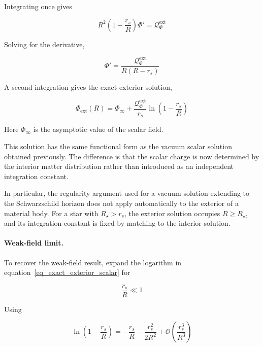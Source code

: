 \documentclass[pdflatex,sn-mathphys-num]{sn-jnl}%
\theoremstyle{thmstyleone}%
\theoremstyle{thmstyletwo}%
\theoremstyle{thmstylethree}%
\begin{document}
Integrating once gives

\begin{equation}
    R^2
    \left(
        1-\frac{r_s}{R}
    \right)
    \Phi'
    =
    \mathcal Q_\Phi^{\mathrm{ext}}
\end{equation}

Solving for the derivative,

\begin{equation}
    \Phi'
    =
    \frac{\mathcal Q_\Phi^{\mathrm{ext}}}
    {R(R-r_s)}
\end{equation}

A second integration gives the exact exterior solution,

\begin{equation}\label{eq_exact_exterior_scalar}
    \boxed{
    \Phi_{\mathrm{ext}}(R)
    =
    \Phi_\infty
    +
    \frac{\mathcal Q_\Phi^{\mathrm{ext}}}{r_s}
    \ln\left(
        1-\frac{r_s}{R}
    \right)
    }
\end{equation}

Here $\Phi_\infty$ is the asymptotic value of the scalar field.

This solution has the same functional form as the vacuum scalar solution obtained previously. The difference is that the scalar charge is now determined by the interior matter distribution rather than introduced as an independent integration constant.

In particular, the regularity argument used for a vacuum solution extending to the Schwarzschild horizon does not apply automatically to the exterior of a material body. For a star with $R_\star>r_s$, the exterior solution occupies $R\geq R_\star$, and its integration constant is fixed by matching to the interior solution.

\paragraph{Weak-field limit.}

To recover the weak-field result, expand the logarithm in equation~\eqref{eq_exact_exterior_scalar} for

\begin{equation}
    \frac{r_s}{R}\ll 1
\end{equation}

Using

\begin{equation}
    \ln\left(
        1-\frac{r_s}{R}
    \right)
    =
    -\frac{r_s}{R}
    -
    \frac{r_s^2}{2R^2}
    +\mathcal O\left(\frac{r_s^3}{R^3}\right)
\end{equation}
\end{document}
